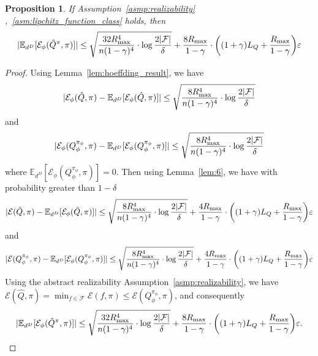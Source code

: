 \documentclass[twoside]{article}
\newtheorem{proposition}{Proposition}
\newcommand{\CAL}[1]{\mathcal{#1}}
\newcommand{\zyh}[1]{{\color{blue}{ [\textbf{Youheng:}} #1]}}
\begin{document}
\begin{proposition}\label{prop:5-16}
If Assumption~\ref{asmp:realizability} ,~\ref{asm:lipchitz_function_class} holds, then
    \begin{align}
        |\mathbb{E}_{d^{D}}[\mathcal{E}_\phi(\hat{Q}^\pi,\pi)]|\leq \sqrt{\frac{32R_{\rm max}^4}{n(1-\gamma)^4}\cdot\log\frac{2|\mathcal{F}|}{\delta}}+\frac{8R_{\rm max}}{1-\gamma}\cdot\bigg((1+\gamma)L_Q+\frac{R_{\rm max}}{1-\gamma}\bigg)\varepsilon
    \end{align}
\end{proposition}
\begin{proof}
    Using Lemma~\ref{lem:hoeffding_result}, we have
    \begin{align}
        |\mathcal{E}_\phi(\hat{Q},\pi)-\mathbb{E}_{d^{D}}[\mathcal{E}_\phi(\hat{Q},\pi)]|\leq\sqrt{\frac{8R_{\rm max}^4}{n(1-\gamma)^4}\cdot\log\frac{2|\mathcal{F}|}{\delta}}
    \end{align}
    and
    \begin{align}
        |\mathcal{E}_\phi({{Q}_\phi^{\pi_\phi}},\pi)-\mathbb{E}_{d^{D}}[\mathcal{E}_\phi({{Q}_\phi^{\pi_\phi}},\pi)]|\leq\sqrt{\frac{8R_{\rm max}^4}{n(1-\gamma)^4}\cdot\log\frac{2|\mathcal{F}|}{\delta}}
    \end{align}
    where 
$
\mathbb{E}_{d^{D}}[\mathcal{E}_\phi({Q}_\phi^{\pi_\phi},\pi)] = 0
$.
Then using Lemma~\ref{lem:6}, we have with probability greater than $1-\delta$
\begin{align}
    |\CAL{E}(\hat{Q},\pi)-\mathbb{E}_{d^D}[\CAL{E}_\phi(\hat{Q},\pi)]|\leq \sqrt{\frac{8R_{\rm max}^4}{n(1-\gamma)^4}\cdot\log\frac{2|\mathcal{F}|}{\delta}}+\frac{4R_{\rm max}}{1-\gamma}\cdot\bigg((1+\gamma)L_Q+\frac{R_{\rm max}}{1-\gamma}\bigg)\varepsilon
\end{align}
and
\begin{align}
    |\CAL{E}({Q}_\phi^{\pi_\phi},\pi)-\mathbb{E}_{d^D}[\CAL{E}_\phi({Q}_\phi^{\pi_\phi},\pi)]|\leq \sqrt{\frac{8R_{\rm max}^4}{n(1-\gamma)^4}\cdot\log\frac{2|\mathcal{F}|}{\delta}}+\frac{4R_{\rm max}}{1-\gamma}\cdot\bigg((1+\gamma)L_Q+\frac{R_{\rm max}}{1-\gamma}\bigg)\varepsilon
\end{align}
Using the abstract realizability Assumption~\ref{asmp:realizability}, we have $\CAL{E}(\hat{Q},\pi)=\min_{f\in\CAL{F}}\CAL{E}(f,\pi)\leq \CAL{E}({Q}_\phi^{\pi_\phi},\pi)$, and consequently
\begin{align}
    |\mathbb{E}_{d^{D}}[\mathcal{E}_\phi(\hat{Q}^\pi,\pi)]|\leq \sqrt{\frac{32R_{\rm max}^4}{n(1-\gamma)^4}\cdot\log\frac{2|\mathcal{F}|}{\delta}}+\frac{8R_{\rm max}}{1-\gamma}\cdot\bigg((1+\gamma)L_Q+\frac{R_{\rm max}}{1-\gamma}\bigg)\varepsilon.
\end{align}
\end{proof}
\end{document}
